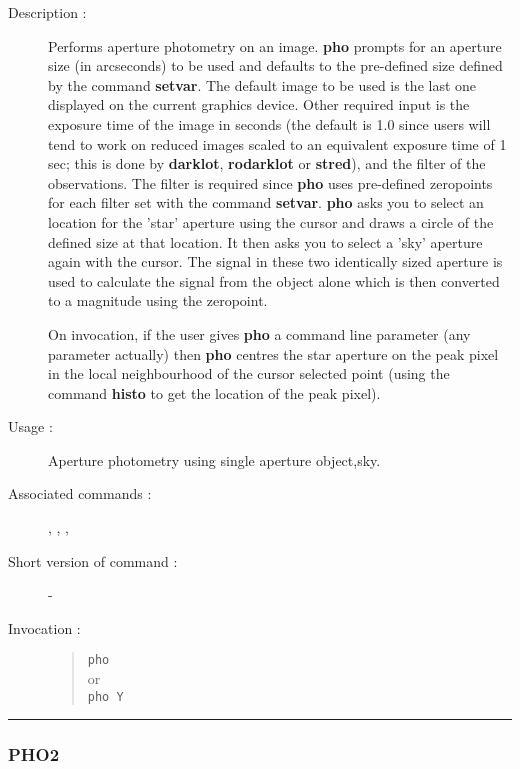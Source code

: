 \begin{description}

\item[Description :] Performs aperture photometry on an image.  {\bf
pho} prompts for an aperture size (in arcseconds) to be used and
defaults to the pre-defined size defined by the command {\bf setvar}.
The default image to be used is the last one displayed on the current
graphics device.  Other required input is the exposure time of the
image in seconds (the default is 1.0 since users will tend to work on
reduced images scaled to an equivalent exposure time of 1 sec; this is
done by {\bf darklot}, {\bf rodarklot} or {\bf stred}), and the filter
of the observations.  The filter is required since {\bf pho} uses
pre-defined zeropoints for each filter set with the command {\bf
setvar}. {\bf pho} asks you to select an location for the 'star'
aperture using the cursor and draws a circle of the defined size at
that location. It then asks you to select a 'sky' aperture again with
the cursor.  The signal in these two identically sized aperture is used
to calculate the signal from the object alone which is then converted
to a magnitude using the zeropoint.

On invocation, if the user gives {\bf pho} a command line parameter (any
parameter actually) then {\bf pho} centres the star aperture on the peak pixel
in the local neighbourhood of the cursor selected point (using the
command {\bf histo} to get the location of the peak pixel).

\item [Usage :] Aperture photometry using single aperture object,sky.

\item [Associated commands :] {\tt {}},
{\tt {}}, {\tt {}},
{\tt {}}

\item [Short version of command :] -

\item[Invocation :]

\begin{quote}{\tt  pho }\\
or \\
{\tt pho Y }
\end{quote}

\end{description}

\hrule
\subsubsection*{\label{PHO2}PHO2}


